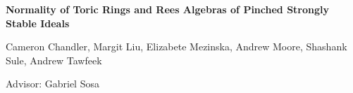 \documentclass[a0, landscape]{a0poster}
\begin{document}



\begin{minipage}{\linewidth}
\begin{center}
\linespread{1.5}
\color{DarkSlateBlue} \Huge \textbf{Normality of Toric Rings and Rees Algebras of Pinched Strongly Stable Ideals}

 \color{Black}
\LARGE  Cameron Chandler, Margit Liu, Elizabete Mezinska, Andrew Moore, Shashank Sule, Andrew Tawfeek


\LARGE  Advisor: Gabriel Sosa %
\end{center}
\end{minipage}
    
\end{document}

